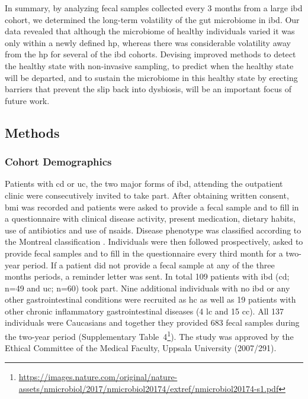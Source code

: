 In summary, by analyzing fecal samples collected every 3 months from a large \gls{ibd} cohort, we determined the long-term volatility of the gut microbiome in \gls{ibd}. Our data revealed that although the microbiome of healthy individuals varied it was only within a newly defined \gls{hp}, whereas there was considerable volatility away from the \gls{hp} for several of the \gls{ibd} cohorts. Devising improved methods to detect the healthy state with non-invasive sampling, to predict when the healthy state will be departed, and to sustain the microbiome in this healthy state by erecting barriers that prevent the slip back into dysbiosis, will be an important focus of future work.


\subsection{Methods}

\subsubsection{Cohort Demographics}

Patients with \gls{cd} or \gls{uc}, the two major forms of \gls{ibd}, attending the outpatient clinic were consecutively invited to take part. After obtaining written consent, \gls{bmi} was recorded and patients were asked to provide a fecal sample and to fill in a questionnaire with clinical disease activity, present medication, dietary habits, use of antibiotics and use of \glspl{nsaid}. Disease phenotype was classified according to the Montreal classification \cite{Silverberg2005}. Individuals were then followed prospectively, asked to provide fecal samples and to fill in the questionnaire every third month for a two-year period. If a patient did not provide a fecal sample at any of the three months periods, a reminder letter was sent. In total 109 patients with \gls{ibd} (\gls{cd}; n=49 and \gls{uc}; n=60) took part. Nine additional individuals with no \gls{ibd} or any other gastrointestinal conditions were recruited as \gls{hc} as well as 19 patients with other chronic inflammatory gastrointestinal diseases (4 \gls{lc} and 15 \gls{cc}).  All 137 individuals were Caucasians and together they provided 683 fecal samples during the two-year period (Supplementary Table~4\footnote{\url{https://images.nature.com/original/nature-assets/nmicrobiol/2017/nmicrobiol20174/extref/nmicrobiol20174-s1.pdf}}). The study was approved by the Ethical Committee of the Medical Faculty, Uppsala University (2007/291).


